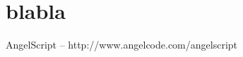 \documentclass[a4paper, 12pt]{report}
\begin{document}
\section{blabla}


\begin{thebibliography}{9}
AngelScript -- http://www.angelcode.com/angelscript

\end{thebibliography}

\clearpage
{}
\listoffigures

\clearpage
{}
\listoftables
\end{document}
